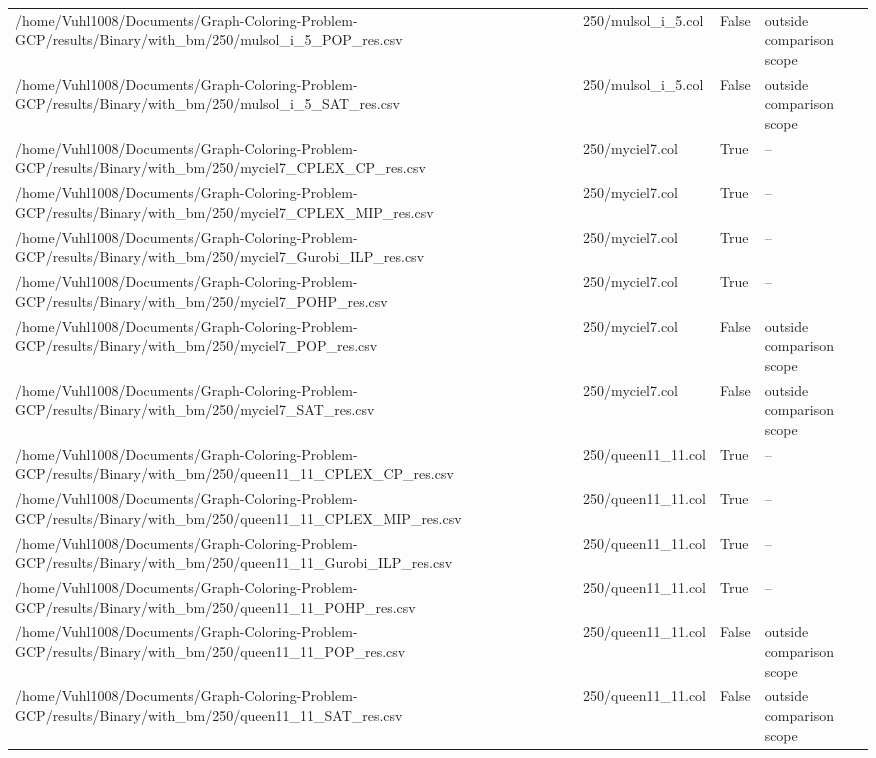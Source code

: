 \begin{table}[htbp]
\begin{tabular}{llll}
/home/Vuhl1008/Documents/Graph-Coloring-Problem-GCP/results/Binary/with\_bm/250/mulsol\_i\_5\_POP\_res.csv & 250/mulsol\_i\_5.col & False & outside comparison scope \\
/home/Vuhl1008/Documents/Graph-Coloring-Problem-GCP/results/Binary/with\_bm/250/mulsol\_i\_5\_SAT\_res.csv & 250/mulsol\_i\_5.col & False & outside comparison scope \\
/home/Vuhl1008/Documents/Graph-Coloring-Problem-GCP/results/Binary/with\_bm/250/myciel7\_CPLEX\_CP\_res.csv & 250/myciel7.col & True & -- \\
/home/Vuhl1008/Documents/Graph-Coloring-Problem-GCP/results/Binary/with\_bm/250/myciel7\_CPLEX\_MIP\_res.csv & 250/myciel7.col & True & -- \\
/home/Vuhl1008/Documents/Graph-Coloring-Problem-GCP/results/Binary/with\_bm/250/myciel7\_Gurobi\_ILP\_res.csv & 250/myciel7.col & True & -- \\
/home/Vuhl1008/Documents/Graph-Coloring-Problem-GCP/results/Binary/with\_bm/250/myciel7\_POHP\_res.csv & 250/myciel7.col & True & -- \\
/home/Vuhl1008/Documents/Graph-Coloring-Problem-GCP/results/Binary/with\_bm/250/myciel7\_POP\_res.csv & 250/myciel7.col & False & outside comparison scope \\
/home/Vuhl1008/Documents/Graph-Coloring-Problem-GCP/results/Binary/with\_bm/250/myciel7\_SAT\_res.csv & 250/myciel7.col & False & outside comparison scope \\
/home/Vuhl1008/Documents/Graph-Coloring-Problem-GCP/results/Binary/with\_bm/250/queen11\_11\_CPLEX\_CP\_res.csv & 250/queen11\_11.col & True & -- \\
/home/Vuhl1008/Documents/Graph-Coloring-Problem-GCP/results/Binary/with\_bm/250/queen11\_11\_CPLEX\_MIP\_res.csv & 250/queen11\_11.col & True & -- \\
/home/Vuhl1008/Documents/Graph-Coloring-Problem-GCP/results/Binary/with\_bm/250/queen11\_11\_Gurobi\_ILP\_res.csv & 250/queen11\_11.col & True & -- \\
/home/Vuhl1008/Documents/Graph-Coloring-Problem-GCP/results/Binary/with\_bm/250/queen11\_11\_POHP\_res.csv & 250/queen11\_11.col & True & -- \\
/home/Vuhl1008/Documents/Graph-Coloring-Problem-GCP/results/Binary/with\_bm/250/queen11\_11\_POP\_res.csv & 250/queen11\_11.col & False & outside comparison scope \\
/home/Vuhl1008/Documents/Graph-Coloring-Problem-GCP/results/Binary/with\_bm/250/queen11\_11\_SAT\_res.csv & 250/queen11\_11.col & False & outside comparison scope \\

\end{tabular}
\end{table}
